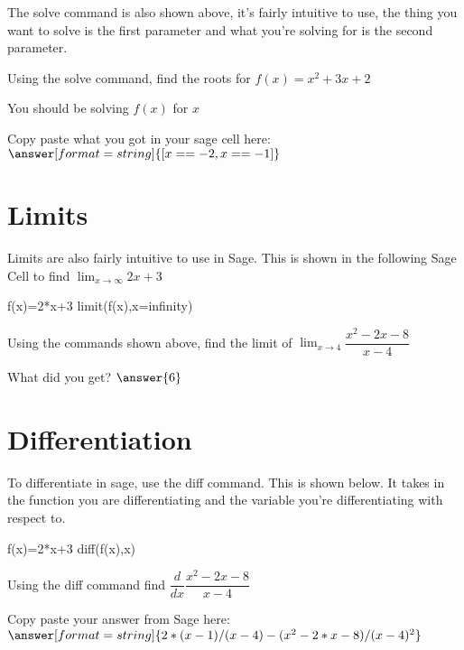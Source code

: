 \documentclass{ximera}
\begin{document}
The solve command is also shown above, it's fairly intuitive to use, the thing you want to solve is the first parameter and what you're solving for is the second parameter.
\begin{question}
Using the solve command, find the roots for $f(x)=x^2+3x+2$
\begin{hint}
You should be solving $f(x)$ for $x$
\end{hint}
\begin{onlineOnly}
\begin{sageCell}

\end{sageCell}
\end{onlineOnly}
Copy paste what you got in your sage cell here: $\answer[format=string]{[x == -2, x == -1]}$
\end{question}

\section{Limits}
Limits are also fairly intuitive to use in Sage. This is shown in the following Sage Cell to find $\displaystyle\lim_{x \to \infty}2x+3$
\begin{onlineOnly}
\begin{sageCell}
f(x)=2*x+3
limit(f(x),x=infinity)
\end{sageCell}
\end{onlineOnly}
\begin{question}
Using the commands shown above, find the limit of $\displaystyle\lim_{x \to 4}\dfrac{x^2-2x-8}{x-4}$
\begin{onlineOnly}
\begin{sageCell}

\end{sageCell}
\end{onlineOnly}
What did you get?
$\answer{6}$
\end{question}

\section{Differentiation}
To differentiate in sage, use the diff command. This is shown below. It takes in the function you are differentiating and the variable you're differentiating with respect to.
\begin{onlineOnly}
\begin{sageCell}
f(x)=2*x+3
diff(f(x),x)
\end{sageCell}
\end{onlineOnly}
\begin{question}
Using the diff command find $\dfrac{d}{dx}\dfrac{x^2-2x-8}{x-4}$
\begin{onlineOnly}
\begin{sageCell}

\end{sageCell}
\end{onlineOnly}
Copy paste your answer from Sage here:
$\answer[format=string]{2*(x - 1)/(x - 4) - (x^2 - 2*x - 8)/(x - 4)^2}$
\end{question}
\end{document}
